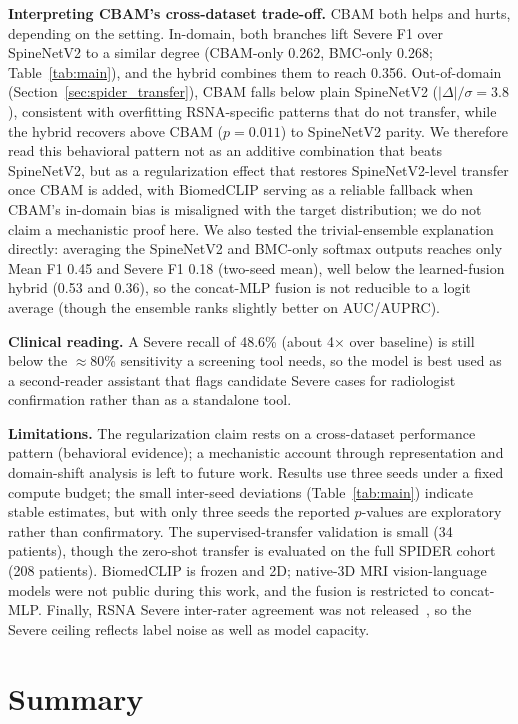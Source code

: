 \documentclass[runningheads]{llncs}
\begin{document}
\textbf{Interpreting CBAM's cross-dataset trade-off.} CBAM both helps and hurts, depending on the setting. In-domain, both branches lift Severe F1 over SpineNetV2 to a similar degree (CBAM-only 0.262, BMC-only 0.268; Table~\ref{tab:main}), and the hybrid combines them to reach 0.356. Out-of-domain (Section~\ref{sec:spider_transfer}), CBAM falls below plain SpineNetV2 ($|\Delta|/\sigma = 3.8$), consistent with overfitting RSNA-specific patterns that do not transfer, while the hybrid recovers above CBAM ($p=0.011$) to SpineNetV2 parity. We therefore read this behavioral pattern not as an additive combination that beats SpineNetV2, but as a regularization effect that restores SpineNetV2-level transfer once CBAM is added, with BiomedCLIP serving as a reliable fallback when CBAM's in-domain bias is misaligned with the target distribution; we do not claim a mechanistic proof here. We also tested the trivial-ensemble explanation directly: averaging the SpineNetV2 and BMC-only softmax outputs reaches only Mean F1 0.45 and Severe F1 0.18 (two-seed mean), well below the learned-fusion hybrid (0.53 and 0.36), so the concat-MLP fusion is not reducible to a logit average (though the ensemble ranks slightly better on AUC/AUPRC).

\textbf{Clinical reading.} A Severe recall of 48.6\% (about 4$\times$ over baseline) is still below the $\approx$80\% sensitivity a screening tool needs, so the model is best used as a second-reader assistant that flags candidate Severe cases for radiologist confirmation rather than as a standalone tool.

\textbf{Limitations.} The regularization claim rests on a cross-dataset performance pattern (behavioral evidence); a mechanistic account through representation and domain-shift analysis is left to future work. Results use three seeds under a fixed compute budget; the small inter-seed deviations (Table~\ref{tab:main}) indicate stable estimates, but with only three seeds the reported $p$-values are exploratory rather than confirmatory. The supervised-transfer validation is small (34 patients), though the zero-shot transfer is evaluated on the full SPIDER cohort (208 patients). BiomedCLIP is frozen and 2D; native-3D MRI vision-language models were not public during this work, and the fusion is restricted to concat-MLP. Finally, RSNA Severe inter-rater agreement was not released~\cite{kaggle2024}, so the Severe ceiling reflects label noise as well as model capacity.

\section{Summary}\label{sec5}
\end{document}

